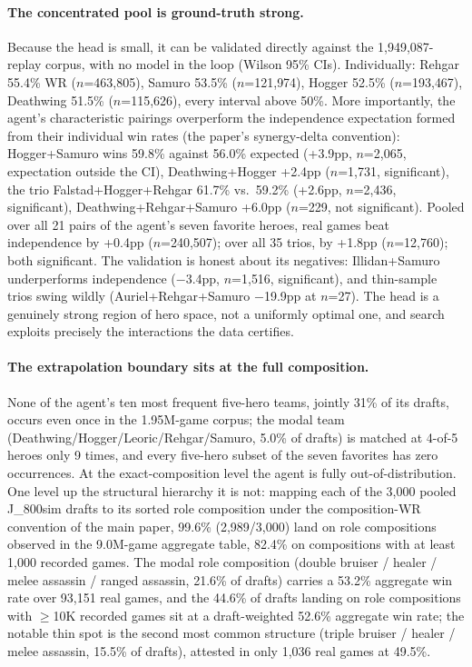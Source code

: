 \documentclass[journal]{IEEEtran}
\begin{document}
\paragraph{The concentrated pool is ground-truth strong.} Because the head is small, it can be validated directly against the 1,949,087-replay corpus, with no model in the loop (Wilson 95\% CIs). Individually: Rehgar 55.4\% WR ($n$=463{,}805), Samuro 53.5\% ($n$=121{,}974), Hogger 52.5\% ($n$=193{,}467), Deathwing 51.5\% ($n$=115{,}626), every interval above 50\%. More importantly, the agent's characteristic pairings overperform the independence expectation formed from their individual win rates (the paper's synergy-delta convention): Hogger+Samuro wins 59.8\% against 56.0\% expected (+3.9pp, $n$=2{,}065, expectation outside the CI), Deathwing+Hogger +2.4pp ($n$=1{,}731, significant), the trio Falstad+Hogger+Rehgar 61.7\% vs.\ 59.2\% (+2.6pp, $n$=2{,}436, significant), Deathwing+Rehgar+Samuro +6.0pp ($n$=229, not significant). Pooled over all 21 pairs of the agent's seven favorite heroes, real games beat independence by +0.4pp ($n$=240{,}507); over all 35 trios, by +1.8pp ($n$=12{,}760); both significant. The validation is honest about its negatives: Illidan+Samuro underperforms independence ($-$3.4pp, $n$=1{,}516, significant), and thin-sample trios swing wildly (Auriel+Rehgar+Samuro $-$19.9pp at $n$=27). The head is a genuinely strong region of hero space, not a uniformly optimal one, and search exploits precisely the interactions the data certifies.

\paragraph{The extrapolation boundary sits at the full composition.} None of the agent's ten most frequent five-hero teams, jointly 31\% of its drafts, occurs even once in the 1.95M-game corpus; the modal team (Deathwing/Hogger/Leoric/Rehgar/Samuro, 5.0\% of drafts) is matched at 4-of-5 heroes only 9 times, and every five-hero subset of the seven favorites has zero occurrences. At the exact-composition level the agent is fully out-of-distribution. One level up the structural hierarchy it is not: mapping each of the 3,000 pooled J\_800sim drafts to its sorted role composition under the composition-WR convention of the main paper, 99.6\% (2,989/3,000) land on role compositions observed in the 9.0M-game aggregate table, 82.4\% on compositions with at least 1,000 recorded games. The modal role composition (double bruiser / healer / melee assassin / ranged assassin, 21.6\% of drafts) carries a 53.2\% aggregate win rate over 93{,}151 real games, and the 44.6\% of drafts landing on role compositions with $\geq$10K recorded games sit at a draft-weighted 52.6\% aggregate win rate; the notable thin spot is the second most common structure (triple bruiser / healer / melee assassin, 15.5\% of drafts), attested in only 1{,}036 real games at 49.5\%.
\end{document}
